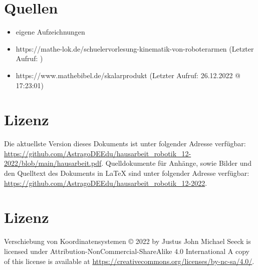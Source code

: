\documentclass{article}
\begin{document}

    \newpage

    \section{Quellen}

    \begin{itemize}
        \item eigene Aufzeichnungen
        \item https://mathe-lok.de/schuelervorlesung-kinematik-von-roboterarmen (Letzter Aufruf: )
        \item https://www.mathebibel.de/skalarprodukt (Letzter Aufruf: 26.12.2022 @ 17:23:01)
    \end{itemize}

    \section{Lizenz}

    Die aktuellste Version dieses Dokuments ist unter folgender Adresse verfügbar: \url{https://github.com/AstragoDEEdu/hausarbeit_robotik_12-2022/blob/main/hausarbeit.pdf}.
    Quelldokumente für Anhänge, sowie Bilder und den Quelltext des Dokuments in \LaTeX{} sind unter folgender Adresse verfügbar:
    \url{https://github.com/AstragoDEEdu/hausarbeit_robotik_12-2022}.

    \section{Lizenz}

    Verschiebung von Koordinatensystemen © 2022 by Justus John Michael Seeck is licensed under Attribution-NonCommercial-ShareAlike 4.0 International
    A copy of this license is available at \url{https://creativecommons.org/licenses/by-nc-sa/4.0/}.
\end{document}
